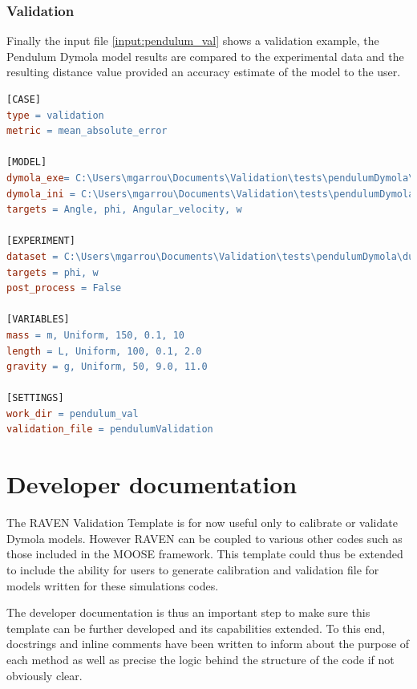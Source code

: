\documentclass[oneside]{book}
\begin{document}
\FloatBarrier
\subsection{Validation}

Finally the input file \ref{input:pendulum_val} shows a validation example, the Pendulum Dymola model results are compared to the experimental data and the resulting distance value provided an accuracy estimate of the model to the user. 

\begin{lstlisting}[language=make,caption={Pendulum input file, Validation}, label={input:pendulum_val}]
[CASE]
type = validation
metric = mean_absolute_error

[MODEL]
dymola_exe= C:\Users\mgarrou\Documents\Validation\tests\pendulumDymola\dymosim.exe
dymola_ini = C:\Users\mgarrou\Documents\Validation\tests\pendulumDymola\dsin.txt
targets = Angle, phi, Angular_velocity, w

[EXPERIMENT]
dataset = C:\Users\mgarrou\Documents\Validation\tests\pendulumDymola\dummy_exp_values.csv
targets = phi, w
post_process = False

[VARIABLES]
mass = m, Uniform, 150, 0.1, 10
length = L, Uniform, 100, 0.1, 2.0
gravity = g, Uniform, 50, 9.0, 11.0

[SETTINGS]
work_dir = pendulum_val
validation_file = pendulumValidation
\end{lstlisting}

















\FloatBarrier
\chapter{Developer documentation}

The RAVEN Validation Template is for now useful only to calibrate or validate Dymola models. However RAVEN can be coupled to various other codes such as those included in the MOOSE framework. This template could thus be extended to include the ability for users to generate calibration and validation file for models written for these simulations codes. 

The developer documentation is thus an important step to make sure this template can be further developed and its capabilities extended. To this end, docstrings and inline comments have been written to inform about the purpose of each method as well as precise the logic behind the structure of the code if not obviously clear. 
\end{document}
